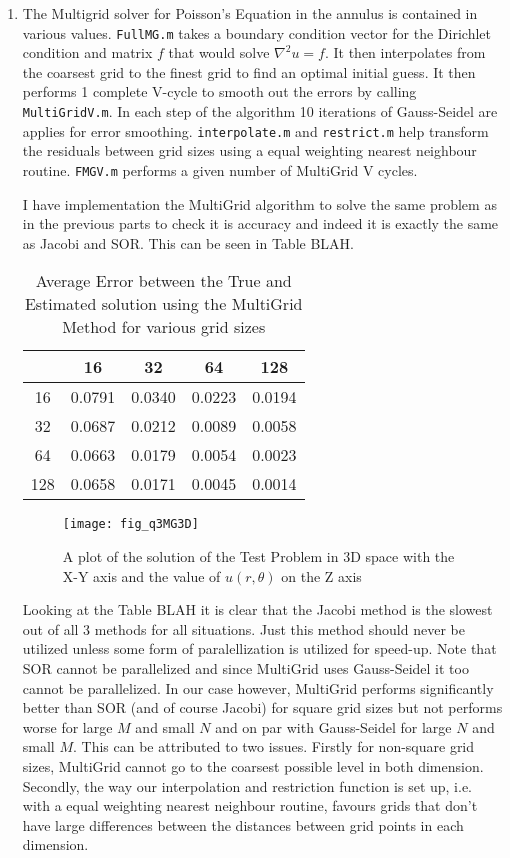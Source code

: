 \documentclass{article}
\begin{document}
\begin{enumerate}
	
	\item The Multigrid solver for Poisson's Equation in the annulus is contained in various values. \texttt{FullMG.m} takes a boundary condition vector for the Dirichlet condition and matrix $f$ that would solve $\nabla^2 u= f$. It then interpolates from the coarsest grid to the finest grid to find an optimal initial guess. It then performs 1 complete V-cycle to smooth out the errors by calling \texttt{MultiGridV.m}. In each step of the algorithm 10 iterations of Gauss-Seidel are applies for error smoothing. \texttt{interpolate.m} and \texttt{restrict.m} help transform the residuals between grid sizes using a equal weighting nearest neighbour routine. \texttt{FMGV.m} performs a given number of MultiGrid V cycles.  
	
	I have implementation the MultiGrid algorithm to solve the same problem as in the previous parts to check it is accuracy and indeed it is exactly the same as Jacobi and SOR. This can be seen in Table BLAH.
	 	\begin{table} [h!]
		\centering 
		\begin{tabular}{|c|cccc|} \hline
		 \diagbox{M}{N} & 16 & 32 & 64 & 128 \\
		\hline
		     16 & 0.0791  &  0.0340  &  0.0223  &  0.0194 \\
    32 & 0.0687  &  0.0212  &  0.0089  &  0.0058 \\ 
    64 & 0.0663  &  0.0179   & 0.0054   & 0.0023 \\
    128 & 0.0658  &  0.0171   & 0.0045  &  0.0014 \\
		 \hline
		\end{tabular}
		\caption{Average Error between the True and Estimated solution using the MultiGrid Method for various grid sizes}
		\label{tab:2}
	\end{table}
	\begin{figure}[h!]
		\centering
		\texttt{[image: fig\_q3MG3D]}
		\caption{A plot of the solution of the Test Problem in 3D space with the X-Y axis and the value of $u(r,\theta)$ on the Z axis}
	\end{figure}
	
	Looking at the Table BLAH it is clear that the Jacobi method is the slowest out of all 3 methods for all situations. Just this method should never be utilized unless some form of paralellization is utilized for speed-up. Note that SOR cannot be parallelized and since MultiGrid uses Gauss-Seidel it too cannot be parallelized. In our case however, MultiGrid performs significantly better than SOR (and of course Jacobi) for square grid sizes but not performs worse for large $M$ and small $N$ and on par with Gauss-Seidel for large $N$ and small $M$. This can be attributed to two issues. Firstly for non-square grid sizes, MultiGrid cannot go to the coarsest possible level in both dimension. Secondly, the way our interpolation and restriction function is set up, i.e. with a equal weighting nearest neighbour routine, favours grids that don't have large differences between the distances between grid points in each dimension.
	

\end{enumerate}
\end{document}
